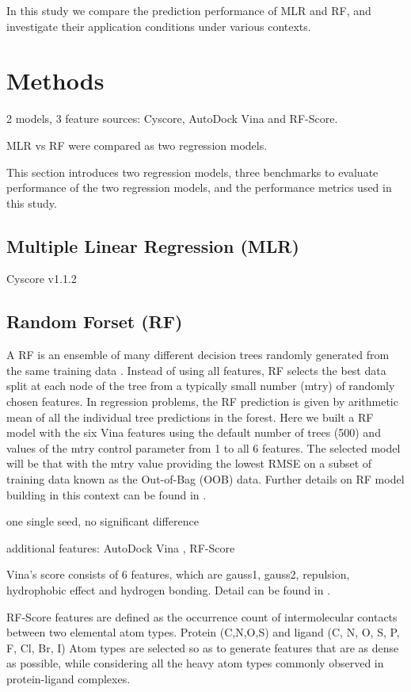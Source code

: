 \documentclass[journal=jacsat,manuscript=article]{achemso}
\begin{document}
In this study we compare the prediction performance of MLR and RF, and investigate their application conditions under various contexts.

\section{Methods}

2 models, 3 feature sources: Cyscore, AutoDock Vina and RF-Score.

MLR vs RF were compared as two regression models.


This section introduces two regression models, three benchmarks to evaluate performance of the two regression models, and the performance metrics used in this study.

\subsection{Multiple Linear Regression (MLR)}

Cyscore v1.1.2

\subsection{Random Forset (RF)}

A RF is an ensemble of many different decision trees randomly generated from the same training data \cite{1309}. Instead of using all features, RF selects the best data split at each node of the tree from a typically small number (mtry) of randomly chosen features. In regression problems, the RF prediction is given by arithmetic mean of all the individual tree predictions in the forest. Here we built a RF model with the six Vina features using the default number of trees (500) and values of the mtry control parameter from 1 to all 6 features. The selected model will be that with the mtry value providing the lowest RMSE on a subset of training data known as the Out-of-Bag (OOB) data. Further details on RF model building in this context can be found in \cite{564}.

one single seed, no significant difference

additional features: AutoDock Vina \cite{595}, RF-Score \cite{564}

Vina's score consists of 6 features, which are gauss1, gauss2, repulsion, hydrophobic effect and hydrogen bonding. Detail can be found in \cite{1362}.

RF-Score features are defined as the occurrence count of intermolecular contacts between two elemental atom types. Protein (C,N,O,S) and ligand (C, N, O, S, P, F, Cl, Br, I) Atom types are selected so as to generate features that are as dense as possible, while considering all the heavy atom types commonly observed in protein-ligand complexes.
\end{document}
